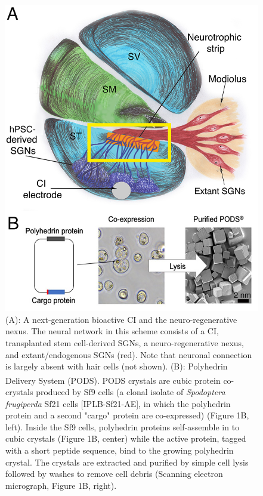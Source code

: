 \documentclass[review]{elsarticle}
\begin{document}
\begin{figure}
	\begin{center}
		\includegraphics[width=\textwidth]{Fig_1.jpg}
	\end{center}
	\caption{
		(A): A next-generation bioactive CI and the neuro-regenerative nexus. The neural network in this scheme consists of a CI, transplanted stem cell-derived SGNs, a neuro-regenerative nexus, and extant/endogenous SGNs (red). Note that neuronal connection is largely absent with hair cells (not shown). (B): Polyhedrin Delivery System (PODS)\textsuperscript{\textregistered}. PODS\textsuperscript{\textregistered} crystals are cubic protein co-crystals produced by Sf9 cells (a clonal isolate of \textit{Spodoptera frugiperda} Sf21 cells [IPLB-Sf21-AE], in which the polyhedrin protein and a second "cargo" protein are co-expressed) (Figure 1B, left). Inside the Sf9 cells, polyhedrin proteins self-assemble in to cubic crystals (Figure 1B, center) while the active protein, tagged with a short peptide sequence, bind to the growing polyhedrin crystal. The crystals are extracted and purified by simple cell lysis followed by washes to remove cell debris (Scanning electron micrograph, Figure 1B, right).
	}
\end{figure}
\end{document}
